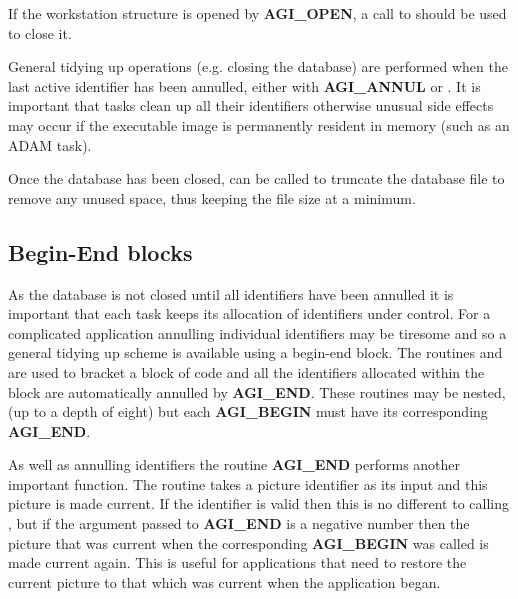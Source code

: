 \documentclass[twoside,11pt]{starlink}
\begin{document}
If the workstation structure is opened by \textbf{AGI\_OPEN}, a call to
 should be used to close it.

General tidying up operations (e.g. closing the database) are performed
when the last active identifier has been annulled, either with
\textbf{AGI\_ANNUL} or
. It is important that tasks clean
up all their identifiers otherwise unusual side effects may occur if
the executable image is permanently resident in memory (such as an
ADAM task).

Once the database has been closed,  can
be called to truncate the database file to remove any unused space, thus
keeping the file size at a minimum.

\subsection{Begin-End blocks\label{bend}}
As the database is not closed until all identifiers have been annulled
it is important that each task keeps its allocation of identifiers
under control. For a complicated application annulling individual
identifiers may be tiresome and so a general tidying up scheme is
available using a begin-end block. The routines
 and
are used to bracket a block of code and all the
identifiers allocated within the block are automatically annulled
by \textbf{AGI\_END}. These routines may be nested, (up to a depth of eight)
but each \textbf{AGI\_BEGIN} must have its corresponding \textbf{AGI\_END}.

As well as annulling identifiers the routine \textbf{AGI\_END} performs another
important function. The routine takes a picture identifier as its input
and this picture is made current. If the identifier is valid then this is
no different to calling ,
but if the argument passed to
\textbf{AGI\_END} is a negative number then the picture that was current when
the corresponding \textbf{AGI\_BEGIN} was called is made current again. This
is useful for applications that need to restore the current picture to
that which was current when the application began.
\end{document}
